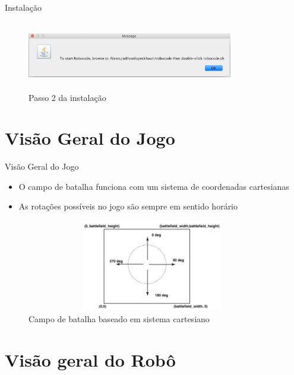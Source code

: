 \begin{frame}
	\begin{block}{Instalação}
		 \begin{figure}[!htb]
			\centering	  				
			\includegraphics[height=3cm, width = 9cm]{./pic/instalacao02.png}
			\caption{Passo 2 da instalação}
			\label{fig_instalacao02}
		\end{figure}
	\end{block}
\end{frame}



\section{Visão Geral do Jogo}

\begin{frame}
	\begin{block}{Visão Geral do Jogo}
		\begin{itemize}
			\item O campo de batalha funciona com um sistema de coordenadas cartesianas
			\item As rotações possíveis no jogo são sempre em sentido horário			
		\end{itemize}
		
		\begin{figure}[!htb]
			\centering
			\includegraphics[height=4cm, width = 11cm]{./pic/campoBatalha.png}
			\caption{Campo de batalha baseado em sistema cartesiano  \citep{ROBOWIKI}}
			\label{fig_instalacao03}
		\end{figure}
	\end{block}
\end{frame}


\section{Visão geral do Robô}

